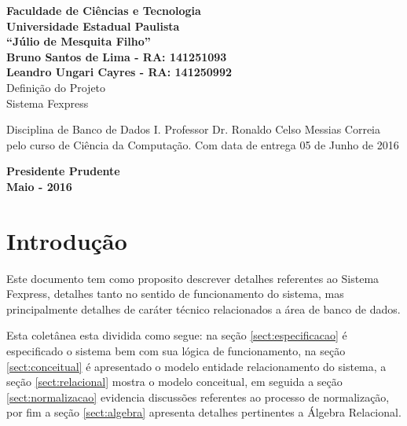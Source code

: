 \documentclass[12pt, onecolumn, titlepage]{article}
\begin{document}

\begin{titlepage} %
	
	\vfill
	\begin{center}
	
		{\large \textbf{Faculdade de Ciências e Tecnologia\\Universidade Estadual Paulista\\``Júlio de Mesquita Filho''}} \\[3cm]
		{\small \textbf{Bruno Santos de Lima - RA: 141251093}}\\
		{\small \textbf{Leandro Ungari Cayres - RA: 141250992}}\\[3cm]
		{\Large Definição do Projeto}\\
		{\Large Sistema Fexpress}\\[3cm]

	\hspace{.45\textwidth} %
	\begin{minipage}{.5\textwidth}
		\small Disciplina de Banco de Dados I. Professor Dr. Ronaldo Celso Messias Correia pelo curso de Ciência da Computação. Com data de entrega 05 de Junho de 2016 \\[0.5cm]
	\end{minipage}

	\vfill
	\vspace{1.5cm}
	
	\large \textbf{Presidente Prudente\\}
	\large \textbf{Maio - 2016}
	
	\end{center}
	
\end{titlepage}
\newpage

\renewcommand{\contentsname}{Índice}
\tableofcontents

\newpage

\section{Introdução}
\label{sect:introducao}

Este documento tem como proposito descrever detalhes referentes ao Sistema Fexpress, detalhes tanto no sentido de funcionamento do sistema, mas principalmente detalhes de caráter técnico relacionados a área de banco de dados. 

Esta coletânea esta dividida como segue: na seção \ref{sect:especificacao} é especificado o sistema bem com sua lógica de funcionamento, na seção \ref{sect:conceitual} é apresentado o modelo entidade relacionamento do sistema, a seção \ref{sect:relacional} mostra o modelo conceitual, em seguida a seção \ref{sect:normalizacao} evidencia discussões referentes ao processo de normalização, por fim a seção \ref{sect:algebra} apresenta detalhes pertinentes a Álgebra Relacional.
\end{document}
